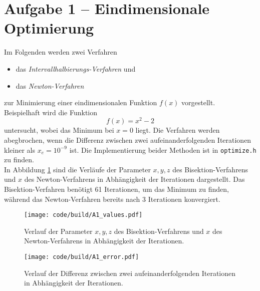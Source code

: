 \section{Aufgabe 1 – Eindimensionale Optimierung}
\label{sec:A1}
Im Folgenden werden zwei Verfahren
\begin{itemize}
    \item das \textit{Intervallhalbierungs-Verfahren} und
    \item das \textit{Newton-Verfahren}
\end{itemize}
zur Minimierung einer eindimensionalen Funktion $f(x)$ vorgestellt.
\\
Beispielhaft wird die Funktion
\begin{equation}
  f(x) = x^2 - 2
\end{equation}
untersucht, wobei das Minimum bei $x=0$ liegt.
Die Verfahren werden abegbrochen, wenn die Differenz zwischen zwei aufeinanderfolgenden Iterationen kleiner als $x_e = 10^{-9}$ ist.
Die Implementierung beider Methoden ist in \texttt{optimize.h} zu finden.
\\
In Abbildung \ref{fig:A1_values} sind die Verläufe der Parameter $x, y, z$ des Bisektion-Verfahrens und $x$ des Newton-Verfahrens in Abhängigkeit der Iterationen dargestellt.
Das Bisektion-Verfahren benötigt 61 Iterationen, um das Minimum zu finden, während das Newton-Verfahren bereits nach 3 Iterationen konvergiert.
\begin{figure}
    \centering
    \texttt{[image: code/build/A1\_values.pdf]}
    \caption{Verlauf der Parameter $x, y, z$ des Bisektion-Verfahrens und $x$ des Newton-Verfahrens in Abhängigkeit der Iterationen.}
    \label{fig:A1_values}
\end{figure}

\begin{figure}
    \centering
    \texttt{[image: code/build/A1\_error.pdf]}
    \caption{Verlauf der Differenz zwischen zwei aufeinanderfolgenden Iterationen in Abhängigkeit der Iterationen.}
    \label{fig:A1_error}
\end{figure}